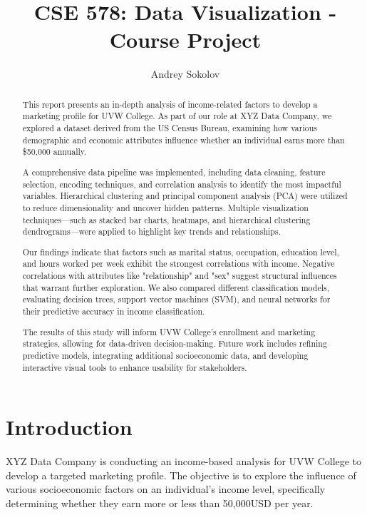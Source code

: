 \documentclass[journal,onecolumn]{IEEEtran}
\begin{document}
\title{CSE 578: Data Visualization - Course Project}

\author{Andrey Sokolov}

\maketitle

\begin{abstract}
    This report presents an in-depth analysis of income-related factors to develop a
    marketing profile for UVW College. As part of our role at XYZ Data Company, we
    explored a dataset derived from the US Census Bureau, examining how various
    demographic and economic attributes influence whether an individual earns more than \$50,000 annually. 
    
    A comprehensive data pipeline was implemented, including data cleaning, feature
    selection, encoding techniques, and correlation analysis to identify the most
    impactful variables. Hierarchical clustering and principal component analysis
    (PCA) were utilized to reduce dimensionality and uncover hidden patterns.
    Multiple visualization techniques—such as stacked bar charts, heatmaps, and hierarchical clustering dendrograms—were applied to highlight key trends and relationships.
    
    Our findings indicate that factors such as marital status, occupation,
    education level, and hours worked per week exhibit the strongest correlations
    with income. Negative correlations with attributes like "relationship" and
    "sex" suggest structural influences that warrant further exploration.
    We also compared different classification models, evaluating decision trees,
    support vector machines (SVM), and neural networks for their predictive accuracy in income classification.
    
    The results of this study will inform UVW College’s enrollment and marketing strategies,
    allowing for data-driven decision-making. Future work includes refining predictive models,
    integrating additional socioeconomic data, and developing interactive visual tools to enhance usability for stakeholders.
    \end{abstract}

\section{Introduction}
XYZ Data Company is conducting an income-based analysis for UVW College to develop
a targeted marketing profile. The objective is to explore the influence of various
socioeconomic factors on an individual’s income level, specifically determining
whether they earn more or less than 50,000USD per year.
\end{document}
